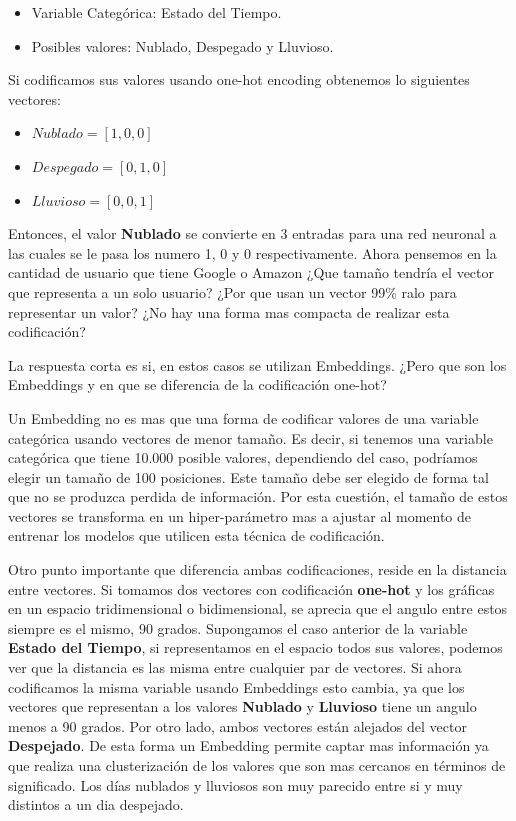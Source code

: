 \documentclass[11pt,a4paper,twoside]{thesis}
\begin{document}
\begin{itemize}
	\item Variable Categórica: Estado del Tiempo.
	\item Posibles valores: Nublado, Despegado y Lluvioso.
\end{itemize}


Si codificamos sus valores usando one-hot encoding obtenemos lo siguientes vectores:

\begin{itemize}
	\item $Nublado    = [1, 0, 0]$
	\item $Despegado  = [0, 1, 0]$
	\item $Lluvioso   = [0, 0, 1]$
\end{itemize}

Entonces, el valor \textbf{Nublado} se convierte en 3 entradas para una red neuronal a las cuales se le pasa los numero 1, 0 y 0 respectivamente. Ahora pensemos en la cantidad de usuario que tiene Google o Amazon ¿Que tamaño tendría el vector que representa a un solo usuario? ¿Por que usan un vector 99\% ralo para representar un valor? ¿No hay una forma mas compacta de realizar esta codificación? 

La respuesta corta es si, en estos casos se utilizan Embeddings. ¿Pero que son los Embeddings y en que se diferencia de la codificación one-hot?

Un Embedding no es mas que una forma de codificar valores de una variable categórica usando vectores de menor tamaño. Es decir, si tenemos una variable categórica
que tiene 10.000 posible valores, dependiendo del caso, podríamos elegir un tamaño de 100 posiciones. Este tamaño debe ser elegido de forma tal que no se produzca
perdida de información. Por esta cuestión, el tamaño de estos vectores se transforma en un hiper-parámetro mas a ajustar al momento de entrenar los modelos que utilicen esta técnica de codificación.

Otro punto importante que diferencia ambas codificaciones, reside en la distancia entre vectores. Si tomamos dos vectores con codificación \textbf{one-hot} y los gráficas en un espacio tridimensional o bidimensional, se aprecia que el angulo entre estos siempre es el mismo, 90 grados. Supongamos el caso anterior de la variable \textbf{Estado del Tiempo}, si representamos en el espacio todos sus valores, podemos ver que la distancia es las misma entre cualquier par de vectores.
Si ahora codificamos la misma variable usando Embeddings esto cambia, ya que los vectores que representan a los valores \textbf{Nublado} y \textbf{Lluvioso} tiene un angulo menos a 90 grados. Por otro lado, ambos vectores están alejados del vector \textbf{Despejado}. De esta forma un Embedding permite captar mas información ya que realiza una clusterización de los valores que son mas cercanos en términos de significado. Los días nublados y lluviosos son muy parecido entre si y muy distintos a un dia despejado.
\end{document}
